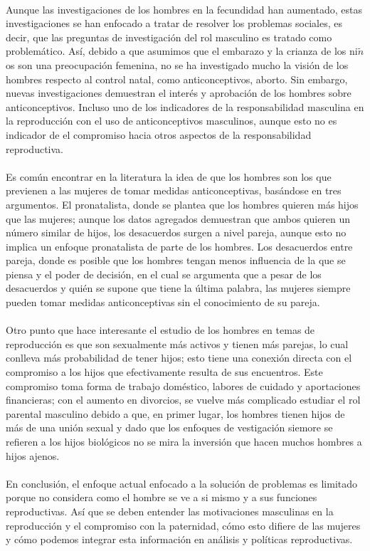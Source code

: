 \documentclass[11pt,spanish,letterpaper]{article}
\theoremstyle{plain}
\begin{document}
\\
Aunque las investigaciones de los hombres en la fecundidad han aumentado, estas investigaciones se han enfocado a tratar de resolver los problemas sociales, es decir, que las preguntas de investigaci\'on del rol masculino es tratado como problem\'atico. As\'i, debido a que asumimos que el embarazo y la crianza de los ni$\tilde{n}$os son una preocupaci\'on femenina, no se ha investigado mucho la visi\'on de los hombres respecto al control natal, como anticonceptivos, aborto. Sin embargo, nuevas investigaciones demuestran el inter\'es y aprobaci\'on de los hombres sobre anticonceptivos. Incluso uno de los indicadores de la responsabilidad masculina en la reproducci\'on con el uso de anticonceptivos masculinos, aunque esto no es indicador de el compromiso hacia otros aspectos de la responsabilidad reproductiva.\\
\\
Es com\'un encontrar en la literatura la idea de que los hombres son los que previenen a las mujeres de tomar medidas anticonceptivas, bas\'andose en tres argumentos. El pronatalista, donde se plantea que los hombres quieren m\'as hijos que las mujeres; aunque los datos agregados demuestran que ambos quieren un n\'umero similar de hijos, los desacuerdos surgen a nivel pareja, aunque esto no implica un enfoque pronatalista de parte de los hombres. Los desacuerdos entre pareja, donde es posible que los hombres tengan menos influencia de la que se piensa y el poder de decisi\'on, en el cual se argumenta que a pesar de los desacuerdos y qui\'en se supone que tiene la \'ultima palabra, las mujeres siempre pueden tomar medidas anticonceptivas sin el conocimiento de su pareja.\\
\\
Otro punto que hace interesante el estudio de los hombres en temas de reproducci\'on es que son sexualmente m\'as activos y tienen m\'as parejas, lo cual conlleva m\'as probabilidad de tener hijos; esto tiene una conexi\'on directa con el compromiso a los hijos que efectivamente resulta de sus encuentros. Este compromiso toma forma de trabajo dom\'estico, labores de cuidado y aportaciones financieras; con el aumento en divorcios, se vuelve m\'as complicado estudiar el rol parental masculino debido a que, en primer lugar, los hombres tienen hijos de m\'as de una uni\'on sexual y dado que los enfoques de vestigaci\'on siemore se refieren a los hijos biol\'ogicos no se mira la inversi\'on que hacen muchos hombres a hijos ajenos.\\
\\
En conclusi\'on, el enfoque actual enfocado a la soluci\'on de problemas es limitado porque no considera como el hombre se ve a si mismo y a sus funciones reproductivas. As\'i que se deben entender las motivaciones masculinas en la reproducci\'on y el compromiso con la paternidad, c\'omo esto difiere de las mujeres y c\'omo podemos integrar esta informaci\'on en an\'alisis y pol\'iticas reproductivas.


\end{document}
